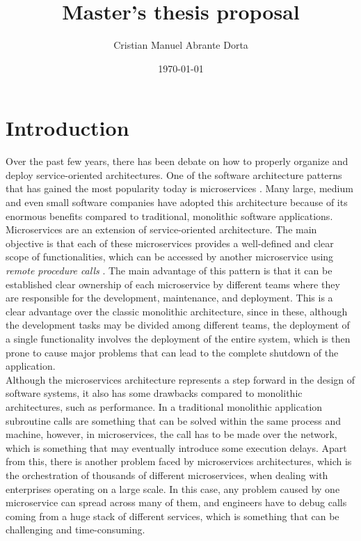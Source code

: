 \documentclass[12pt]{article}
\title{Master's thesis proposal}
\author{Cristian Manuel Abrante Dorta}
\date{\today}
\begin{document}
\maketitle

\section{Introduction}

Over the past few years, there has been debate on how to properly organize and deploy service-oriented architectures. One of the software architecture patterns that has gained the most popularity today is microservices \cite{MicroservicesAdoption}. Many large, medium and even small software companies have adopted this architecture because of its enormous benefits compared to traditional, monolithic software applications.\\

Microservices are an extension of service-oriented architecture. The main objective is that each of these microservices provides a well-defined and clear scope of functionalities, which can be accessed by another microservice using \textit{remote procedure calls} \cite{nelson1981remote}. The main advantage of this pattern is that it can be established clear ownership of each microservice by different teams where they are responsible for the development, maintenance, and deployment. This is a clear advantage over the classic monolithic architecture, since in these, although the development tasks may be divided among different teams, the deployment of a single functionality involves the deployment of the entire system, which is then prone to cause major problems that can lead to the complete shutdown of the application.\\

Although the microservices architecture represents a step forward in the design of software systems, it also has some drawbacks compared to monolithic architectures, such as performance. In a traditional monolithic application subroutine calls are something that can be solved within the same process and machine, however, in microservices, the call has to be made over the network, which is something that may eventually introduce some execution delays. Apart from this, there is another problem faced by microservices architectures, which is the orchestration of thousands of different microservices, when dealing with enterprises operating on a large scale. In this case, any problem caused by one microservice can spread across many of them, and engineers have to debug calls coming from a huge stack of different services, which is something that can be challenging and time-consuming.\\
\end{document}
